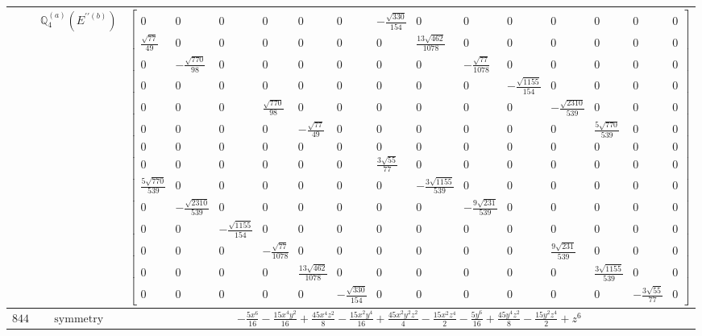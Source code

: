 \documentclass[fleqn,8pt,landscape]{jsarticle}
\begin{document}
\begin{longtable}{ccc}
$  $ & $ \mathbb{Q}_{4}^{(a)}(E^{\prime\prime(b)}) $ & $ \begin{bmatrix} 0 & 0 & 0 & 0 & 0 & 0 & - \frac{\sqrt{330}}{154} & 0 & 0 & 0 & 0 & 0 & 0 & 0 \\ \frac{\sqrt{77}}{49} & 0 & 0 & 0 & 0 & 0 & 0 & \frac{13 \sqrt{462}}{1078} & 0 & 0 & 0 & 0 & 0 & 0 \\ 0 & - \frac{\sqrt{770}}{98} & 0 & 0 & 0 & 0 & 0 & 0 & - \frac{\sqrt{77}}{1078} & 0 & 0 & 0 & 0 & 0 \\ 0 & 0 & 0 & 0 & 0 & 0 & 0 & 0 & 0 & - \frac{\sqrt{1155}}{154} & 0 & 0 & 0 & 0 \\ 0 & 0 & 0 & \frac{\sqrt{770}}{98} & 0 & 0 & 0 & 0 & 0 & 0 & - \frac{\sqrt{2310}}{539} & 0 & 0 & 0 \\ 0 & 0 & 0 & 0 & - \frac{\sqrt{77}}{49} & 0 & 0 & 0 & 0 & 0 & 0 & \frac{5 \sqrt{770}}{539} & 0 & 0 \\ 0 & 0 & 0 & 0 & 0 & 0 & 0 & 0 & 0 & 0 & 0 & 0 & 0 & 0 \\ 0 & 0 & 0 & 0 & 0 & 0 & \frac{3 \sqrt{55}}{77} & 0 & 0 & 0 & 0 & 0 & 0 & 0 \\ \frac{5 \sqrt{770}}{539} & 0 & 0 & 0 & 0 & 0 & 0 & - \frac{3 \sqrt{1155}}{539} & 0 & 0 & 0 & 0 & 0 & 0 \\ 0 & - \frac{\sqrt{2310}}{539} & 0 & 0 & 0 & 0 & 0 & 0 & - \frac{9 \sqrt{231}}{539} & 0 & 0 & 0 & 0 & 0 \\ 0 & 0 & - \frac{\sqrt{1155}}{154} & 0 & 0 & 0 & 0 & 0 & 0 & 0 & 0 & 0 & 0 & 0 \\ 0 & 0 & 0 & - \frac{\sqrt{77}}{1078} & 0 & 0 & 0 & 0 & 0 & 0 & \frac{9 \sqrt{231}}{539} & 0 & 0 & 0 \\ 0 & 0 & 0 & 0 & \frac{13 \sqrt{462}}{1078} & 0 & 0 & 0 & 0 & 0 & 0 & \frac{3 \sqrt{1155}}{539} & 0 & 0 \\ 0 & 0 & 0 & 0 & 0 & - \frac{\sqrt{330}}{154} & 0 & 0 & 0 & 0 & 0 & 0 & - \frac{3 \sqrt{55}}{77} & 0 \end{bmatrix} $ \\ \hline
$ 844 $ & $ \text{symmetry} $ & $ - \frac{5 x^{6}}{16} - \frac{15 x^{4} y^{2}}{16} + \frac{45 x^{4} z^{2}}{8} - \frac{15 x^{2} y^{4}}{16} + \frac{45 x^{2} y^{2} z^{2}}{4} - \frac{15 x^{2} z^{4}}{2} - \frac{5 y^{6}}{16} + \frac{45 y^{4} z^{2}}{8} - \frac{15 y^{2} z^{4}}{2} + z^{6} $ \\

\end{longtable}
\end{document}
